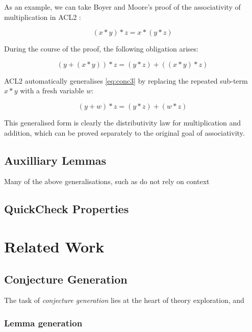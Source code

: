 \documentclass[]{article}
\begin{document}
As an example, we can take Boyer and Moore's proof of the associativity of multiplication in ACL2 \cite{boyer1983proof}:

$$(x * y) * z = x * (y * z)$$

During the course of the proof, the following obligation arises:

\begin{equation}
  \tag{conc3}
  (y + (x * y)) * z = (y * z) + ((x * y) * z)
  \label{eq:conc3}
\end{equation}

ACL2 automatically generalises \eqref{eq:conc3} by replacing the repeated sub-term $x * y$ with a fresh variable $w$:

\begin{equation}
  \tag{conc4}
  (y + w) * z = (y * z) + (w * z)
  \label{eq:conc4}
\end{equation}

This generalised form is clearly the distributivity law for multiplication and addition, which can be proved separately to the original goal of associativity.

\subsection{Auxilliary Lemmas}

Many of the above generalisations, such as  do not rely on context

\subsection{QuickCheck Properties}



\section{Related Work}
\label{related}

\subsection{Conjecture Generation}

The task of \emph{conjecture generation} lies at the heart of theory exploration, and

\subsubsection{Lemma generation}
\end{document}

